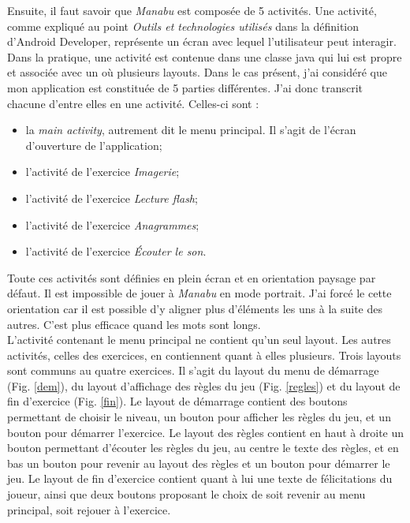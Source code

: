 Ensuite, il faut savoir que \textit{Manabu} est composée de 5 activités. Une activité, comme expliqué au point \textit{Outils et technologies utilisés} dans la définition d'Android Developer, représente un écran avec lequel l'utilisateur peut interagir. Dans la pratique, une activité est contenue dans une classe java qui lui est propre et associée avec un où plusieurs layouts. Dans le cas présent, j'ai considéré que mon application est constituée de 5 parties différentes. J'ai donc transcrit chacune d'entre elles en une activité. Celles-ci sont :
\begin{itemize}
\item la \textit{main activity}, autrement dit le menu principal. Il s'agit de l'écran d'ouverture de l'application;
\item l'activité de l'exercice \textit{Imagerie};
\item l'activité de l'exercice \textit{Lecture flash};
\item l'activité de l'exercice \textit{Anagrammes};
\item l'activité de l'exercice \textit{Écouter le son}.
\end{itemize}
Toute ces activités sont définies en plein écran et en orientation paysage par défaut. Il est impossible de jouer à \textit{Manabu} en mode portrait. J'ai forcé le cette orientation car il est possible d'y aligner plus d'éléments les uns à la suite des autres. C'est plus efficace quand les mots sont longs.\\

L'activité contenant le menu principal ne contient qu'un seul layout. Les autres activités, celles des exercices, en contiennent quant à elles plusieurs. Trois layouts sont communs au quatre exercices. Il s'agit du layout du menu de démarrage (Fig. \ref{dem}), du layout d'affichage des règles du jeu (Fig. \ref{regles}) et du layout de fin d'exercice (Fig. \ref{fin}). Le layout de démarrage contient des boutons permettant de choisir le niveau, un bouton pour afficher les règles du jeu, et un bouton pour démarrer l'exercice. Le layout des règles contient en haut à droite un bouton permettant d'écouter les règles du jeu, au centre le texte des règles, et en bas un bouton pour revenir au layout des règles et un bouton pour démarrer le jeu. Le layout de fin d'exercice contient quant à lui une texte de félicitations du joueur, ainsi que deux boutons proposant le choix de soit revenir au menu principal, soit rejouer à l'exercice.\\

